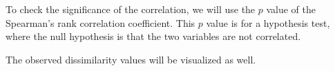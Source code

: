 To check the significance of the correlation, we will use the \(p\) value of the Spearman's rank correlation coefficient. This \(p\) value is for a hypothesis test, where the null hypothesis is that the two variables are not correlated.


The observed dissimilarity values will be visualized as well.







